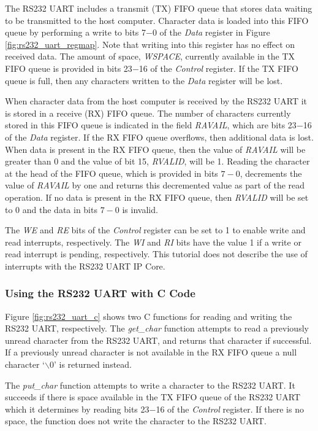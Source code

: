 \documentclass[11pt, twoside, pdftex]{article}
\begin{document}
The RS232 UART includes a transmit (TX) FIFO queue that stores data 
waiting to be transmitted to the host computer. Character data is loaded into this FIFO queue by performing a write to bits 7$-$0
of the {\it Data} register in Figure \ref{fig:rs232_uart_regmap}.  
Note that writing into this register has no effect 
on received data.  The amount of space, {\it WSPACE}, currently available in the TX FIFO queue is 
provided in bits 23$-$16 of the {\it Control} register.  If
the TX FIFO queue is full, then any characters written to the {\it Data} register will be lost.

When character data from the host computer is received by the RS232 UART 
it is stored in a receive (RX) FIFO queue. The number of characters currently stored in this FIFO queue is
indicated in the field {\it RAVAIL}, which are
bits 23$-$16 of the {\it Data} register.  If the RX FIFO queue overflows, then
additional
data is lost. When data is present in the RX FIFO queue, then the value of {\it RAVAIL} will be 
greater than 0 and the value of bit 15, {\it RVALID}, will be 1. Reading the character at
the head of the FIFO queue, which is provided in bits $7-0$, decrements the value of {\it RAVAIL} 
by one and returns this decremented value as part of the read
operation. If no data is present in the RX FIFO queue, then {\it RVALID} will 
be set to 0 and the data in bits $7-0$ is invalid.

The {\it WE} and {\it RE} bits of the {\it Control} register can be set to 1 to enable write and read interrupts, respectively. The {\it WI} and {\it RI} bits have the value 1 if a write or read interrupt is pending, respectively.  This tutorial does not describe the use of interrupts with the RS232 UART IP Core.

\subsubsection{Using the RS232 UART with C Code}
\label{sec:rs232_c}

Figure \ref{fig:rs232_uart_c} shows two C functions for reading and writing the RS232 UART, respectively. 
The \textit{get\_char} function attempts to read a previously unread character from the RS232 UART, and returns that character if successful. If a previously unread character is not available in the RX FIFO queue a null character `$\backslash$0' is returned instead. 

The \textit{put\_char} function attempts to write a character to the RS232 UART. It succeeds if there is space available in the TX FIFO queue of the RS232 UART which it determines by reading bits 23$-$16 of the \textit{Control} register. If there is no space, the function does not write the character to the RS232 UART.
\end{document}
